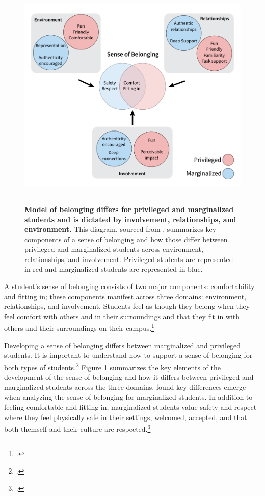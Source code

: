 \documentclass[10pt, twocolumn]{article}
\begin{document}
            \begin{figure}[t!]
                \begin{center}
                \includegraphics[height = 0.35 \paperheight]{figures/sense_of_belonging.pdf}
                \end{center}
                \caption{\textbf{Model of belonging differs for privileged and marginalized students and is dictated by involvement, relationships, and environment.} This diagram, sourced from \cite{vaccaro_development_2016}, summarizes key components of a sense of belonging and how those differ between privileged and marginalized students across environment, relationships, and involvement. Privileged students are represented in red and marginalized students are represented in blue.}
                \label{fig:sense_of_belonging}
                \rule{\textwidth}{1pt}
            \end{figure}

            A student's sense of belonging consists of two major components: comfortability and fitting in; these components manifest across three domains: environment, relationships, and involvement. Students feel as though they belong when they feel comfort with others and in their surroundings and that they fit in with others and their surroundings on their campus.\footcite{vaccaro_development_2016}
            
            Developing a sense of belonging differs between marginalized and privileged students. It is important to understand how to support a sense of belonging for both types of students.\footcite{vaccaro_development_2016} Figure \ref{fig:sense_of_belonging} summarizes the key elements of the development of the sense of belonging and how it differs between privileged and marginalized students across the three domains. \cite{vaccaro_development_2016} found key differences emerge when analyzing the sense of belonging for marginalized students. In addition to feeling comfortable and fitting in, marginalized students value safety and respect where they feel physically safe in their settings, welcomed, accepted, and that both themself and their culture are respected.\footcite{vaccaro_development_2016}
\end{document}
